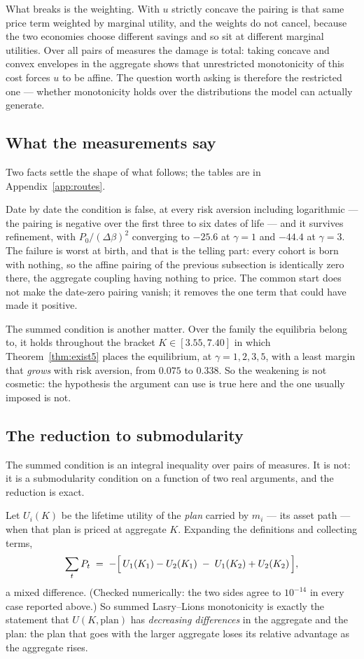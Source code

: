 What breaks is the weighting. With $u$ strictly concave the pairing is that same price term
weighted by marginal utility, and the weights do not cancel, because the two economies choose
different savings and so sit at different marginal utilities. Over all pairs of measures the
damage is total: taking concave and convex envelopes in the aggregate shows that unrestricted
monotonicity of this cost forces $u$ to be affine. The question worth asking is therefore the
restricted one --- whether monotonicity holds over the distributions the model can actually
generate.

\subsection{What the measurements say}

Two facts settle the shape of what follows; the tables are in Appendix~\ref{app:routes}.

Date by date the condition is false, at every risk aversion including logarithmic --- the pairing is
negative over the first three to six dates of life --- and it survives refinement, with
$P_0/(\Delta\beta)^2$ converging to $-25.6$ at $\gamma=1$ and $-44.4$ at $\gamma=3$. The failure is
worst at birth, and that is the telling part: every cohort is born with nothing, so the affine pairing
of the previous subsection is identically zero there, the aggregate coupling having nothing to price.
The common start does not make the date-zero pairing vanish; it removes the one term that could have
made it positive.

The summed condition is another matter. Over the family the equilibria belong to, it holds throughout
the bracket $K\in[3.55,7.40]$ in which Theorem~\ref{thm:exist5} places the equilibrium, at
$\gamma=1,2,3,5$, with a least margin that \emph{grows} with risk aversion, from $0.075$ to $0.338$.
So the weakening is not cosmetic: the hypothesis the argument can use is true here and the one usually
imposed is not.

\subsection{The reduction to submodularity}

The summed condition is an integral inequality over pairs of measures. It is not: it is a
submodularity condition on a function of two real arguments, and the reduction is exact.

Let $U_i(K)$ be the lifetime utility of the \emph{plan} carried by $m_i$ --- its asset path --- when
that plan is priced at aggregate $K$. Expanding the definitions and collecting terms,
\[
  \sum_t P_t \;=\; -\Bigl[\,U_1(K_1)-U_2(K_1)\;-\;U_1(K_2)+U_2(K_2)\,\Bigr],
\]
a mixed difference. (Checked numerically: the two sides agree to $10^{-14}$ in every case
reported above.) So summed Lasry--Lions monotonicity is exactly the statement that $U(K,\text{plan})$
has \emph{decreasing differences} in the aggregate and the plan: the plan that goes with the larger
aggregate loses its relative advantage as the aggregate rises.

